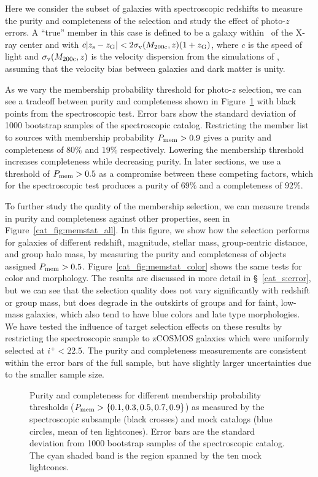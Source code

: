 Here we consider the subset of galaxies with spectroscopic redshifts
to measure the purity and completeness of the selection and study the
effect of photo-$z$ errors. A ``true'' member in this case is defined to
be a galaxy within \rvir\ of the X-ray center and with $c|\mbox{$z_{\rm s}$}-\mbox{$z_{\rm G}$}| <
2\sigma_{\rm v}(\mbox{$M_{200\rm{c}}$},z)(1+\mbox{$z_{\rm G}$})$, where $c$ is the speed of light and
$\sigma_{\rm v}(\mbox{$M_{200\rm{c}}$},z)$ is the velocity dispersion from the
simulations of \citet{Evrard2008}, assuming that the velocity bias between
galaxies and dark matter is unity.

As we vary the membership probability threshold for photo-$z$ selection,
we can see a tradeoff between purity and completeness shown in
Figure~\ref{cat_fig:memstat_threshold} with black points from the
spectroscopic test. Error bars show the standard deviation of 1000
bootstrap samples of the spectroscopic catalog. Restricting the member
list to sources with membership probability $P_{\rm mem} > 0.9$ gives a purity and
completeness of $80\%$ and $19\%$ respectively. Lowering the
membership threshold increases completeness while decreasing
purity. In later sections, we use a threshold of $P_{\rm mem}>0.5$ as
a compromise between these competing factors, which for the
spectroscopic test produces a purity of $69\%$ and a completeness of
$92\%$. 

To further study the quality of the membership selection, we can
measure trends in purity and completeness against other properties,
seen in Figure~\ref{cat_fig:memstat_all}. In this figure, we show how the
selection performs for galaxies of different redshift, magnitude,
stellar mass, group-centric distance, and group halo mass, by
measuring the purity and completeness of objects assigned $P_{\rm
  mem}>0.5$. Figure~\ref{cat_fig:memstat_color} shows
the same tests for color and morphology. The results are discussed in more detail in 
\S~\ref{cat_s:error}, but we can see that the selection quality does not
vary significantly with redshift or group mass, but does degrade in
the outskirts of groups and for faint, low-mass galaxies, which also
tend to have blue colors and late type morphologies. We have tested the
influence of target selection effects on 
these results by restricting the spectroscopic sample to
zCOSMOS galaxies which were uniformly selected at
$i^+<22.5$. The purity and completeness measurements are
consistent within the error bars of the full sample, but have slightly
larger uncertainties due to the smaller sample size.

\begin{figure}
\caption{Purity and completeness for different membership probability
  thresholds ($P_{\rm mem}>\{0.1,0.3,0.5,0.7,0.9\}$) as measured by the spectroscopic subsample
  (black crosses) and mock catalogs (blue circles, mean of ten lightcones). Error bars
  are the standard deviation from 1000 bootstrap samples of the spectroscopic catalog. The cyan
  shaded band is the region spanned by the ten mock lightcones.} 
\label{cat_fig:memstat_threshold}
\end{figure}

